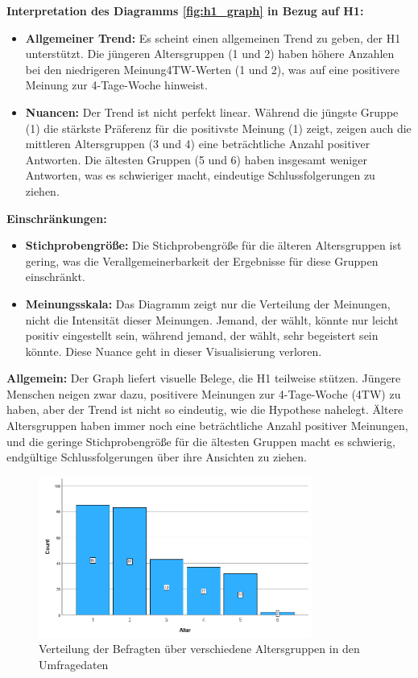 \textbf{Interpretation des Diagramms \ref{fig:h1_graph} in Bezug auf H1:}
\begin{itemize}
    \item \textbf{Allgemeiner Trend:  }Es scheint einen allgemeinen Trend zu geben, der H1 unterstützt. 
    Die jüngeren Altersgruppen (1 und 2) haben höhere Anzahlen bei den niedrigeren Meinung4TW-Werten 
    (1 und 2), was auf eine positivere Meinung zur 4-Tage-Woche hinweist.
    \item \textbf{Nuancen: }Der Trend ist nicht perfekt linear. Während die jüngste Gruppe (1) die stärkste 
    Präferenz für die positivste Meinung (1) zeigt, zeigen auch die mittleren Altersgruppen (3 und 4) 
    eine beträchtliche Anzahl positiver Antworten. Die ältesten Gruppen (5 und 6) haben insgesamt weniger 
    Antworten, was es schwieriger macht, eindeutige Schlussfolgerungen zu ziehen.
\end{itemize}

\textbf{Einschränkungen:}
\begin{itemize}
    \item \textbf{Stichprobengröße:  }Die Stichprobengröße für die älteren Altersgruppen ist gering, 
    was die Verallgemeinerbarkeit der Ergebnisse für diese Gruppen einschränkt.
    \item \textbf{Meinungsskala: }Das Diagramm zeigt nur die Verteilung der Meinungen, nicht die 
    Intensität dieser Meinungen. Jemand, der  wählt, könnte nur leicht positiv eingestellt sein, 
    während jemand, der  wählt, sehr begeistert sein könnte. Diese Nuance geht in dieser 
    Visualisierung verloren.
\end{itemize}

\textbf{Allgemein:}
Der Graph liefert visuelle Belege, die H1 teilweise stützen. Jüngere Menschen neigen zwar dazu, 
positivere Meinungen zur 4-Tage-Woche (4TW) zu haben, aber der Trend ist nicht so eindeutig, wie 
die Hypothese nahelegt. Ältere Altersgruppen haben immer noch eine beträchtliche Anzahl positiver 
Meinungen, und die geringe Stichprobengröße für die ältesten Gruppen macht es schwierig, endgültige 
Schlussfolgerungen über ihre Ansichten zu ziehen.

\begin{figure}[h]
    \centering
    \includegraphics[width=0.8\textwidth]{04_Artefakte/01_Abbildungen/hypothese_1/h1_saeulen.png}
    \caption{Verteilung der Befragten über verschiedene Altersgruppen in den Umfragedaten}
    \label{fig:h1_saeulen}
\end{figure}

